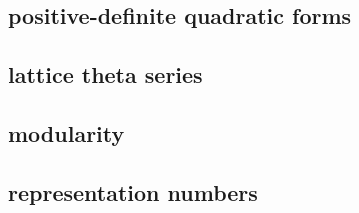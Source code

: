 

\subsection{positive-definite quadratic forms}
\label{b3:subsec:240501}

\subsection{lattice theta series}
\label{b3:subsec:240502}

\subsection{modularity}
\label{b3:subsec:240503}

\subsection{representation numbers}
\label{b3:subsec:240504}


